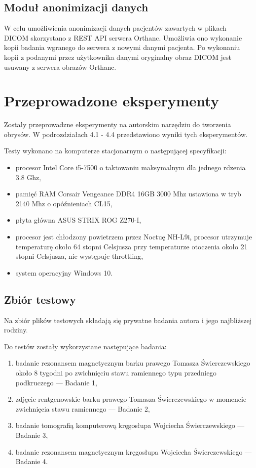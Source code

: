 \documentclass[a4paper,11pt,twoside,openright]{report}
\newcommand\blankpage{%
    \null
    \thispagestyle{empty}%
    \newpage}
\theoremstyle{definition}
\begin{document}
\section {Moduł anonimizacji danych}

W celu umożliwienia anonimizacji danych pacjentów zawartych w plikach DICOM skorzystano
z REST API serwera Orthanc. Umożliwia ono wykonanie kopii badania wgranego do serwera
z nowymi danymi pacjenta. Po wykonaniu kopii z podanymi przez użytkownika danymi
oryginalny obraz DICOM jest usuwany z serwera obrazów Orthanc.


\afterpage{\blankpage}

\chapter {Przeprowadzone eksperymenty}

Zostały przeprowadzne eksperymenty na autorskim narzędziu do tworzenia obrysów.
W podrozdziałach 4.1 - 4.4 przedstawiono wyniki tych eksperymentów.

Testy wykonano na komputerze stacjonarnym o następującej specyfikacji:
\begin{itemize}[noitemsep]
\item procesor Intel Core i5-7500 o taktowaniu maksymalnym dla jednego rdzenia 3.8 Ghz,
\item pamięć RAM Corsair Vengeance DDR4 16GB 3000 Mhz ustawiona w tryb 2140 Mhz o opóźnieniach CL15,
\item płyta główna ASUS STRIX ROG Z270-I,
\item procesor jest chłodzony powietrzem przez Noctuę NH-L9i, procesor utrzymuje
temperaturę około 64 stopni Celsjusza przy temperaturze otoczenia około 21 stopni
Celsjusza, nie występuje throttling,
\item system operacyjny Windows 10.
\end{itemize}

\section {Zbiór testowy}

Na zbiór plików testowych składają się prywatne badania autora i jego najbliższej rodziny.

Do testów zostały wykorzystane następujące badania:
\begin{enumerate}[noitemsep]
\item badanie rezonansem magnetycznym barku prawego Tomasza Świerczewskiego około
8 tygodni po zwichnięciu stawu ramiennego typu przedniego podkruczego --- Badanie 1,
\item zdjęcie rentgenowskie barku prawego Tomasza Świerczewskiego w momencie zwichnięcia stawu ramiennego --- Badanie 2,
\item badanie tomografią komputerową kręgosłupa Wojciecha Świerczewskiego --- Badanie 3,
\item badanie rezonansem magnetycznym kręgosłupa Wojciecha Świerczewskiego --- Badanie 4.
\end{enumerate}
\end{document}
